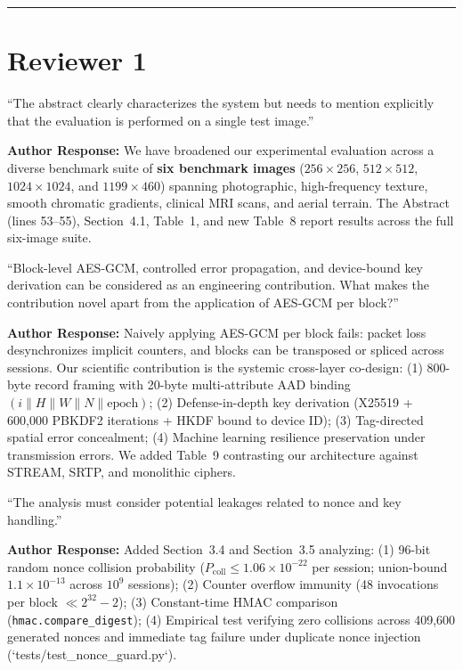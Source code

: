 \documentclass[11pt,a4paper]{article}
\begin{document}
\vspace{1em}
\hrule
\vspace{1em}

\section*{Reviewer 1}

\begin{tcolorbox}[title=Comment 1.1 (Single Test Image in Abstract)]
``The abstract clearly characterizes the system but needs to mention explicitly that the evaluation is performed on a single test image.''
\end{tcolorbox}
\textbf{Author Response:} We have broadened our experimental evaluation across a diverse benchmark suite of \textbf{six benchmark images} ($256\times 256$, $512\times 512$, $1024\times 1024$, and $1199\times 460$) spanning photographic, high-frequency texture, smooth chromatic gradients, clinical MRI scans, and aerial terrain. The Abstract (lines 53--55), Section~4.1, Table~1, and new Table~8 report results across the full six-image suite.

\begin{tcolorbox}[title=Comment 1.2 (Novelty Beyond Per-Block AES-GCM)]
``Block-level AES-GCM, controlled error propagation, and device-bound key derivation can be considered as an engineering contribution. What makes the contribution novel apart from the application of AES-GCM per block?''
\end{tcolorbox}
\textbf{Author Response:} Naively applying AES-GCM per block fails: packet loss desynchronizes implicit counters, and blocks can be transposed or spliced across sessions. Our scientific contribution is the systemic cross-layer co-design:
(1) 800-byte record framing with 20-byte multi-attribute AAD binding $(i \parallel H \parallel W \parallel N \parallel \text{epoch})$;
(2) Defense-in-depth key derivation (X25519 + 600,000 PBKDF2 iterations + HKDF bound to device ID);
(3) Tag-directed spatial error concealment;
(4) Machine learning resilience preservation under transmission errors.
We added Table~9 contrasting our architecture against STREAM, SRTP, and monolithic ciphers.

\begin{tcolorbox}[title=Comment 1.3 (Nonce and Key Handling Leakage Analysis)]
``The analysis must consider potential leakages related to nonce and key handling.''
\end{tcolorbox}
\textbf{Author Response:} Added Section~3.4 and Section~3.5 analyzing: (1) 96-bit random nonce collision probability ($P_{\text{coll}} \le 1.06 \times 10^{-22}$ per session; union-bound $1.1 \times 10^{-13}$ across $10^9$ sessions); (2) Counter overflow immunity (48 invocations per block $\ll 2^{32}-2$); (3) Constant-time HMAC comparison (\texttt{hmac.compare\_digest}); (4) Empirical test verifying zero collisions across 409,600 generated nonces and immediate tag failure under duplicate nonce injection (`tests/test_nonce_guard.py`).
\end{document}
